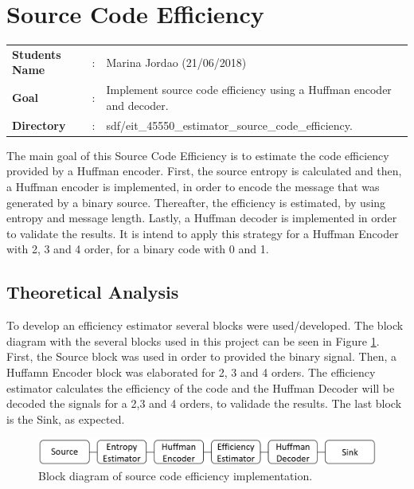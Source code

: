 \clearpage
\section{Source Code Efficiency}

\begin{refsection}

\begin{tcolorbox}	
\begin{tabular}{p{2.75cm} p{0.2cm} p{10.5cm}} 	
\textbf{Students Name}  &:& Marina Jordao (21/06/2018)\\
\textbf{Goal}          &:& Implement source code efficiency using a Huffman encoder and decoder.\\
\textbf{Directory}          &:& sdf/eit\_45550\_estimator\_source\_code\_efficiency.
\end{tabular}
\end{tcolorbox}

The main goal of this Source Code Efficiency is to estimate the code efficiency provided by a Huffman encoder. First, the source entropy is calculated and then, a Huffman encoder is implemented, in order to encode the message that was generated by a binary source. 
Thereafter, the efficiency is estimated, by using entropy and message length. Lastly, a Huffman decoder is implemented in order to validate the results.
It is intend to apply this strategy for a Huffman Encoder with 2, 3 and 4 order, for a binary code with 0 and 1.


\subsection{Theoretical Analysis}


To develop an efficiency estimator several blocks were used/developed. The block diagram with the several blocks used in this project can be seen in  Figure \ref{f:RF_C}.
First, the Source block was used in order to provided the binary signal. Then, a Huffamn Encoder block was elaborated for 2, 3 and 4 orders. The efficiency estimator calculates the efficiency of the code and the Huffman Decoder will be decoded the signals for a 2,3 and 4 orders, to validade the results. The last block is the Sink, as expected.



\begin{figure}[!h]
\centering
\includegraphics[width=6in]{./sdf/eit_45550_estimator_source_code_efficiency/figures/blockdiagram.png}
\caption[Block diagram of communication system]{Block diagram of source code efficiency implementation.}
\label{f:RF_C}
\end{figure}


\end{refsection}
